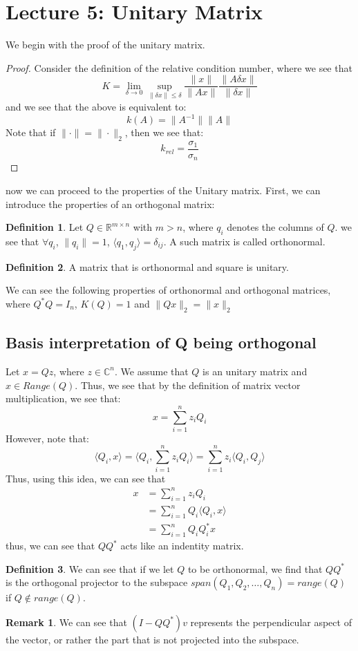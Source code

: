 \documentclass[11pt]{article}
\theoremstyle{definition}
\newtheorem{definition}{Definition}[section]
\newtheorem{remark}{Remark}[section]
\newcommand{\C}{\mathbb{C}}
\begin{document}
\section{Lecture 5: Unitary Matrix}
We begin with the proof of the unitary matrix. 
\begin{proof}
  Consider the definition of the relative condition number, where we see that 
  \[
  K = \lim_{\delta \to 0} \sup_{\|\delta x\| \leq \delta} \frac{\|x\|}{\|Ax\|} \frac{\|A \delta x\|}{\| \delta x\|}
  \]
  and we see that the above is equivalent to:
  \[
  k(A) = \|A^{-1}\| \|A\|
  \]
  Note that if $\| \cdot \| = \| \cdot \|_2$, then we see that:
  \[
  k_{rel} = \frac{\sigma_1}{\sigma_n}
  \]
\end{proof}
now we can proceed to the properties of the Unitary matrix. First, we can introduce the properties of an orthogonal matrix:
\begin{definition}
  Let \( Q \in \mathbb{R}^{m \times n} \) with \( m > n \), where $q_i$ denotes the columns of $Q$. we see that $\forall q_i$, $\|q_i\| = 1$, $\langle q_1 , q_j \rangle = \delta_{ij}$. A such matrix is called orthonormal. 
\end{definition}
\begin{definition}
 A matrix that is orthonormal and square is unitary. 
\end{definition}
We can see the following properties of orthonormal and orthogonal matrices, where $Q^* Q = I_n$, $K(Q) = 1$ and $\|Qx\|_2 = \|x\|_2$
\subsection{Basis interpretation of Q being orthogonal}
Let $x = Qz$, where $z \in \C^n$. We assume that $Q$ is an unitary matrix and $x \in Range(Q)$. Thus, we see that by the definition of matrix vector multiplication, we see that:
\[
x = \sum_{i = 1}^{n} z_i Q_i
\]
However, note that:
\[
\langle Q_i, x \rangle = \langle Q_i , \sum_{i = 1}^{n} z_i Q_i \rangle = \sum_{i = 1}^{n} z_i \langle Q_i, Q_j \rangle 
\]
Thus, using this idea, we can see that 
\begin{align*}
  x &= \sum_{i = 1}^{n} z_i Q_i\\
  &= \sum_{i = 1}^{n} Q_i \langle Q_i , x \rangle \\
  &= \sum_{i = 1}^{n} Q_i Q_i^* x
\end{align*}
thus, we can see that $Q Q^*$ acts like an indentity matrix. 
\begin{definition}
  We can see that if we let $Q$ to be orthonormal, we find that $QQ^*$ is the orthogonal projector to the subspace $span(Q_1, Q_2, \dots, Q_n) = range (Q)$ if $Q \not \in range(Q)$. 
\end{definition}
\begin{remark}
  We can see that $(I - QQ^*)v$ represents the perpendicular aspect of the vector, or rather the part that is not projected into the subspace.
\end{remark}
\end{document}
